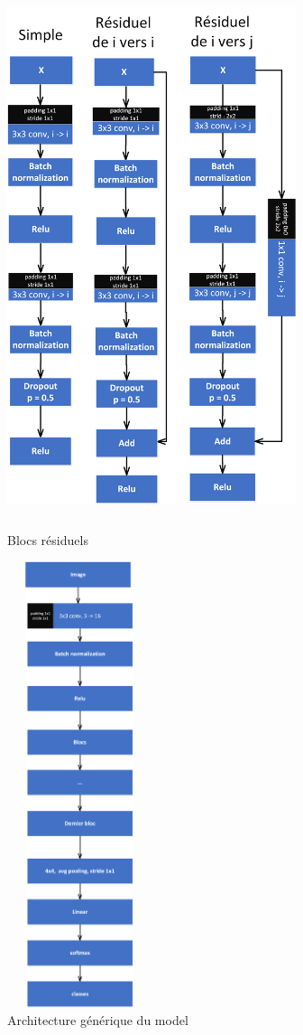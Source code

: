 \documentclass{article}
\begin{document}
\begin{figure}[h]
    \centering
    \includegraphics[width=240pt,height=450pt]{./schema/bloc.png}
    \caption{Blocs résiduels}\label{fig: res_blocs}
\end{figure}


\begin{figure}[h]
    \centering
    \includegraphics[width=120pt,height=370pt]{./schema/net.png}
    \caption{Architecture générique du model}\label{fig: net}
\end{figure}
\end{document}
